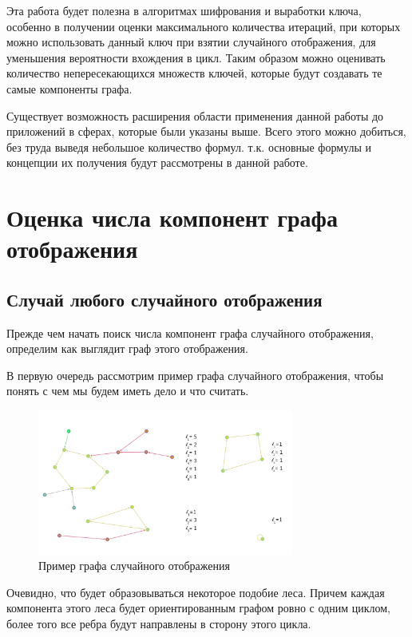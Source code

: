 \documentclass[10pt, a4paper]{report}
\theoremstyle{definition}
\begin{document}
Эта работа будет полезна в алгоритмах шифрования и выработки ключа, особенно в получении оценки максимального количества итераций, при которых можно использовать данный ключ при взятии случайного отображения, для уменьшения вероятности вхождения в цикл. Таким образом можно оценивать количество непересекающихся множеств ключей, которые будут создавать те самые компоненты графа. 

Существует возможность расширения области применения данной работы до приложений в сферах, которые были указаны выше. Всего этого можно добиться, без труда выведя небольшое количество формул. т.к. основные формулы и концепции их получения будут рассмотрены в данной работе.

\chapter{Оценка числа компонент графа отображения}

\section{Случай любого случайного отображения}
Прежде чем начать поиск числа компонент графа случайного отображения, определим как выглядит граф этого отображения.

В первую очередь рассмотрим пример графа случайного отображения, чтобы понять с чем мы будем иметь дело и что считать.

\begin{figure}[h]
	\centering
	\includegraphics[width=0.75\textwidth]{graph_ex.jpg}
	\caption{Пример графа случайного отображения}
	\label{graph_ex}
\end{figure}

Очевидно, что будет образовываться некоторое подобие леса. Причем каждая компонента этого леса будет ориентированным графом ровно с одним циклом, более того все ребра будут направлены в сторону этого цикла.
\end{document}
